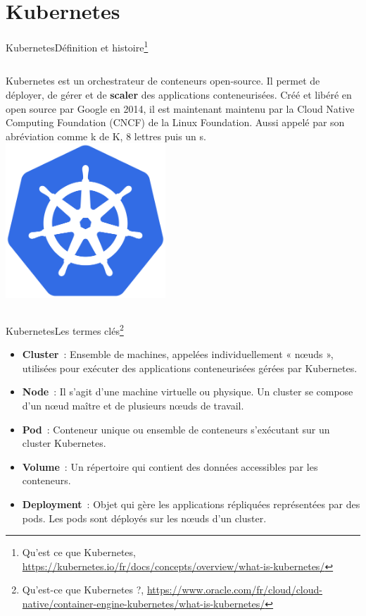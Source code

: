 \documentclass{beamer}
\begin{document}
    \section{Kubernetes}\label{sec:kubernetes}

    \begin{frame}{Kubernetes}{Définition et histoire\footnote{Qu'est ce que Kubernetes, \url{https://kubernetes.io/fr/docs/concepts/overview/what-is-kubernetes/}}}
        \begin{columns}
            Kubernetes est un orchestrateur de conteneurs open-source.
            Il permet de déployer, de gérer et de \textbf{scaler} des applications conteneurisées.
            \bigbreak
            Créé et libéré en open source par Google en 2014, il est maintenant maintenu par la Cloud Native Computing Foundation (CNCF) de la Linux Foundation.
            \bigbreak
            Aussi appelé par son abréviation  comme k de K, 8 lettres puis un s.
            \centering
            \includegraphics[width=6cm]{image/kubernetes-logo}
        \end{columns}
    \end{frame}

    \begin{frame}{Kubernetes}{Les termes clés\footnote{\label{k8soracle}Qu’est-ce que Kubernetes ?, \url{https://www.oracle.com/fr/cloud/cloud-native/container-engine-kubernetes/what-is-kubernetes/}}}
        \begin{itemize}
            \item \textbf{Cluster}~: Ensemble de machines, appelées individuellement « nœuds », utilisées pour exécuter des applications conteneurisées gérées par Kubernetes.
            \item \textbf{Node}~: Il s'agit d'une machine virtuelle ou physique.
            Un cluster se compose d'un nœud maître et de plusieurs nœuds de travail.
            \item \textbf{Pod}~: Conteneur unique ou ensemble de conteneurs s’exécutant sur un cluster Kubernetes.
            \item \textbf{Volume}~: Un répertoire qui contient des données accessibles par les conteneurs.
            \item \textbf{Deployment}~: Objet qui gère les applications répliquées représentées par des pods.
            Les pods sont déployés sur les nœuds d’un cluster.
        \end{itemize}
    \end{frame}
\end{document}
